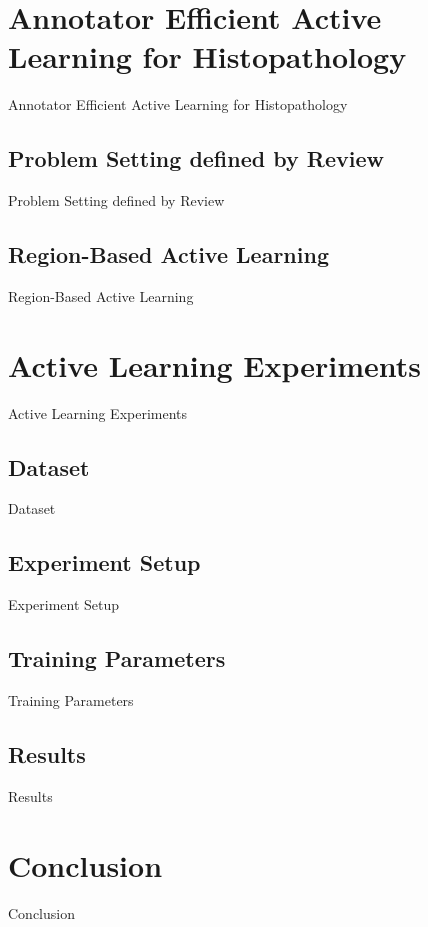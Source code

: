 \section{Annotator Efficient Active Learning for Histopathology}
Annotator Efficient Active Learning for Histopathology

\subsection{Problem Setting defined by Review}
Problem Setting defined by Review

\subsection{Region-Based Active Learning}
Region-Based Active Learning



\section{Active Learning Experiments}
Active Learning Experiments

\subsection{Dataset}
Dataset

\subsection{Experiment Setup}
Experiment Setup

\subsection{Training Parameters}
Training Parameters

\subsection{Results}
Results



\section{Conclusion}
Conclusion
